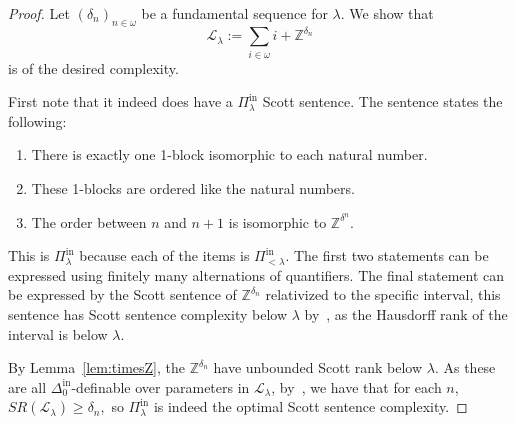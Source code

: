 \documentclass[10pt,a4paper]{amsart}
\providecommand{\tightlist}{%
  \setlength{\itemsep}{0pt}\setlength{\parskip}{0pt}}
\providecommand{\L}{\mathcal{L}}
\providecommand{\Pinf}[1]{\Pi^{\mathrm{in}}_{#1}}
\providecommand{\Dinf}[1]{\Delta^{\mathrm{in}}_{#1}}
\newcommand{\SR}{SR}
\newcommand{\Z}{\mathbb{Z}}
\renewcommand{\L}{\mathcal{L}}
\begin{document}
\begin{proof}
Let $(\delta_n)_{n\in\omega}$ be a fundamental sequence for $\lambda$. We show that
\[\L_\lambda:=\sum_{i\in\omega}i+\Z^{\delta_n}\]
is of the desired complexity. 

First note that it indeed does have a $\Pinf{\lambda}$ Scott sentence. The sentence states the following:
\begin{enumerate}\tightlist
    \item There is exactly one 1-block isomorphic to each natural number. 
    \item These 1-blocks are ordered like the natural numbers.
    \item The order between $n$ and $n+1$ is isomorphic to $\Z^{\delta^n}.$
\end{enumerate}
This is $\Pinf{\lambda}$ because each of the items is $\Pinf{<\lambda}$. 
The first two statements can be expressed using finitely many alternations of quantifiers. 
The final statement can be expressed by the Scott sentence of $\Z^{\delta_n}$
relativized to the specific interval, this sentence has Scott sentence
complexity below $\lambda$ by~\cite{AR20}, as the Hausdorff rank of the interval
is below $\lambda$. 

By Lemma~\ref{lem:timesZ}, the $\Z^{\delta_n}$ have unbounded Scott rank below $\lambda$. 
As these are all $\Dinf0$-definable over parameters in $\L_\lambda$,
by~\cite[Lemma 4.3]{MonIntermediate}, we have that for each $n$, $\SR(\L_\lambda)\geq\delta_n,$ so $\Pinf{\lambda}$ is indeed the optimal Scott sentence complexity.
\end{proof}
\end{document}
